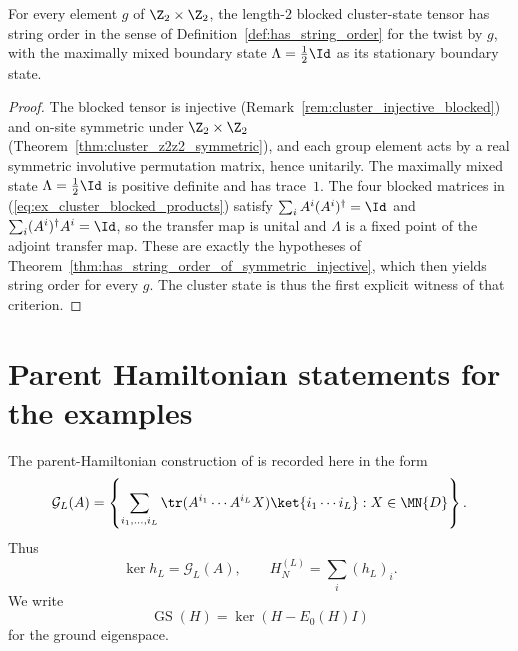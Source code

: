 \begin{theorem}\label{thm:cluster_string_order}
    \leanok
    For every element $g$ of $\Z_2 \times \Z_2$, the length-$2$ blocked cluster-state
    tensor has string order in the sense of
    Definition~\ref{def:has_string_order} for the twist by $g$, with the
    maximally mixed boundary state $\Lambda = \tfrac{1}{2}\Id$ as its stationary
    boundary state.
\end{theorem}
\begin{proof}
    \leanok
    The blocked tensor is injective (Remark~\ref{rem:cluster_injective_blocked})
    and on-site symmetric under $\Z_2 \times \Z_2$
    (Theorem~\ref{thm:cluster_z2z2_symmetric}), and each group element acts by a
    real symmetric involutive permutation matrix, hence unitarily.  The
    maximally mixed state $\Lambda = \tfrac{1}{2}\Id$ is positive definite and
    has trace~$1$.  The four blocked matrices in
    (\ref{eq:ex_cluster_blocked_products}) satisfy
    $\sum_i A^i (A^i)^\dagger = \Id$ and $\sum_i (A^i)^\dagger A^i = \Id$, so the
    transfer map is unital and $\Lambda$ is a fixed point of the adjoint transfer
    map.  These are exactly the hypotheses of
    Theorem~\ref{thm:has_string_order_of_symmetric_injective}, which then yields
    string order for every $g$.  The cluster state is thus the first explicit
    witness of that criterion.
\end{proof}

\section{Parent Hamiltonian statements for the examples}\label{sec:example_parent_hamiltonians}

The parent-Hamiltonian construction of \cite[lines~1988--2000]{Cirac2021Matrix}
is recorded here in the form
\[
    \mathcal G_L(A)=
    \left\{
        \sum_{i_1,\ldots,i_L}
        \tr(A^{i_1}\cdots A^{i_L}X)
        \ket{i_1\cdots i_L}
        : X\in \MN{D}
    \right\}.
\]
Thus
\[
    \ker h_L=\mathcal G_L(A),
    \qquad
    H_N^{(L)}=\sum_i (h_L)_i .
\]
We write
\[
    \operatorname{GS}(H)=\ker(H-E_0(H)I)
\]
for the ground eigenspace.

